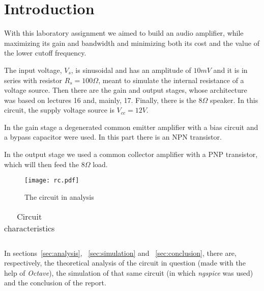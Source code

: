 \section{Introduction}
\label {sec:introduction}


With this laboratory assignment we aimed to build an audio amplifier, while maximizing its gain and bandwidth and minimizing both its cost and the value of the lower cutoff frequency.

The input voltage, $V_s$, is sinusoidal and has an amplitude of $10 mV$ and it is in series with resistor $R_s=100 \Omega$, meant to simulate the internal resistance of a voltage source. Then there are the gain and output stages, whose architecture was based on lectures 16 and, mainly, 17. Finally, there is the $8 \Omega$ speaker. In this circuit, the supply voltage source is $V_{cc}=12 V$.

In the gain stage a degenerated common emitter amplifier with a bias circuit and a bypass capacitor were used. In this part there is an NPN transistor.

In the output stage we used a common collector amplifier with a PNP transistor, which will then feed the $8 \Omega$ load.



\begin{figure}[H] \centering
\texttt{[image: rc.pdf]}
\caption{The circuit in analysis}
\label{fig:circuit}
\end{figure}


\begin{table}[H]
  \centering
  \begin{tabular}{|c|c|}
    \hline
      
  \end{tabular}
  \caption{Circuit characteristics}
  \label{tab:resistance}
\end{table}

In sections~\ref{sec:analysis}, ~\ref{sec:simulation} and ~\ref{sec:conclusion}, there are, respectively, the theoretical analysis of the circuit in question (made with the help of \textit{Octave}), the simulation of that same circuit (in which \textit{ngspice} was used) and the conclusion of the report.
